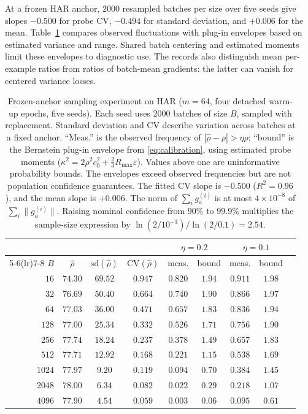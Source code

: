 \documentclass{article}
\begin{document}
At a frozen HAR anchor, $2000$ resampled batches per size over five seeds give slopes $-0.500$ for probe CV, $-0.494$ for standard deviation, and $+0.006$ for the mean. Table~\ref{tab:certificate} compares observed fluctuations with plug-in envelopes based on estimated variance and range. Shared batch centering and estimated moments limit these envelopes to diagnostic use. The records also distinguish mean per-example ratios from ratios of batch-mean gradients: the latter can vanish for centered variance losses.

\begin{table}[t]
\centering
\footnotesize
\caption{Frozen-anchor sampling experiment on HAR ($m=64$, four detached warm-up epochs, five seeds). Each seed uses $2000$ batches of size $B$, sampled with replacement. Standard deviation and CV describe variation across batches at a fixed anchor. ``Meas.'' is the observed frequency of $|\hat\rho-\rho|>\eta\rho$; ``bound'' is the Bernstein plug-in envelope from \eqref{eq:calibration}, using estimated probe moments ($\kappa^2=2\rho^2c_0^2+\frac23R_{\max}\varepsilon$). Values above one are uninformative probability bounds. The envelopes exceed observed frequencies but are not population confidence guarantees. The fitted CV slope is $-0.500$ ($R^2=0.96$), and the mean slope is $+0.006$. The norm of $\sum_i g_a^{(i)}$ is at most $4\times10^{-8}$ of $\sum_i\|g_a^{(i)}\|$. Raising nominal confidence from $90\%$ to $99.9\%$ multiplies the sample-size expression by $\ln(2/10^{-3})/\ln(2/0.1)=2.54$.}
\label{tab:certificate}
\begin{tabular}{rcccccccc}
\toprule
& & & & \multicolumn{2}{c}{$\eta=0.2$} & \multicolumn{2}{c}{$\eta=0.1$} \\
\cmidrule(lr){5-6}\cmidrule(lr){7-8}
$B$ & $\hat\rho$ & $\mathrm{sd}(\hat\rho)$ & $\mathrm{CV}(\hat\rho)$ & meas. & bound & meas. & bound \\
\midrule
$16$   & $74.30$ & $69.52$ & $0.947$ & $0.820$ & $1.94$ & $0.911$ & $1.98$ \\
$32$   & $76.69$ & $50.40$ & $0.664$ & $0.740$ & $1.90$ & $0.866$ & $1.97$ \\
$64$   & $77.03$ & $36.00$ & $0.471$ & $0.657$ & $1.83$ & $0.836$ & $1.94$ \\
$128$  & $77.00$ & $25.34$ & $0.332$ & $0.526$ & $1.71$ & $0.756$ & $1.90$ \\
$256$  & $77.74$ & $18.24$ & $0.237$ & $0.378$ & $1.49$ & $0.657$ & $1.83$ \\
$512$  & $77.71$ & $12.92$ & $0.168$ & $0.221$ & $1.15$ & $0.538$ & $1.69$ \\
$1024$ & $77.97$ & $9.20$  & $0.119$ & $0.094$ & $0.70$ & $0.384$ & $1.45$ \\
$2048$ & $78.00$ & $6.34$  & $0.082$ & $0.022$ & $0.29$ & $0.218$ & $1.07$ \\
$4096$ & $77.90$ & $4.54$  & $0.059$ & $0.003$ & $0.06$ & $0.095$ & $0.61$ \\
\bottomrule
\end{tabular}
\end{table}
\end{document}
